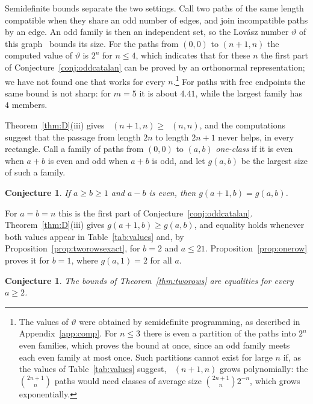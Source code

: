 \documentclass[11pt]{amsart}
\newtheorem{conjecture}[theorem]{Conjecture}
\theoremstyle{definition}
\theoremstyle{remark}
\numberwithin{equation}{section}
\DeclareMathOperator{\Meven}{M_{ev}}
\DeclareMathOperator{\Modd}{M_{od}}
\begin{document}
Semidefinite bounds separate the two settings. Call two paths of the same length compatible when they share an odd number of edges, and join incompatible paths by an edge. An odd family is then an independent set, so the Lov\'asz number $\vartheta$ of this graph~\cite{Lo} bounds its size. For the paths from $(0,0)$ to $(n+1,n)$ the computed value of $\vartheta$ is $2^n$ for $n\le4$, which indicates that for these $n$ the first part of Conjecture~\ref{conj:oddcatalan} can be proved by an orthonormal representation; we have not found one that works for every $n$.\footnote{The values of $\vartheta$ were obtained by semidefinite programming, as described in Appendix~\ref{app:comp}. For $n\le3$ there is even a partition of the paths into $2^n$ even families, which proves the bound at once, since an odd family meets each even family at most once. Such partitions cannot exist for large $n$ if, as the values of Table~\ref{tab:values} suggest, $\Meven(n+1,n)$ grows polynomially: the $\binom{2n+1}{n}$ paths would need classes of average size $\binom{2n+1}{n}2^{-n}$, which grows exponentially.} For paths with free endpoints the same bound is not sharp: for $m=5$ it is about $4.41$, while the largest family has $4$ members.

Theorem~\ref{thm:D}(iii) gives $\Modd(n+1,n)\ge\Meven(n,n)$, and the computations suggest that the passage from length $2n$ to length $2n+1$ never helps, in every rectangle. Call a family of paths from $(0,0)$ to $(a,b)$ \emph{one-class} if it is even when $a+b$ is even and odd when $a+b$ is odd, and let $g(a,b)$ be the largest size of such a family.

\begin{conjecture}\label{conj:shift}
If $a\ge b\ge1$ and $a-b$ is even, then $g(a+1,b)=g(a,b)$.
\end{conjecture}

For $a=b=n$ this is the first part of Conjecture~\ref{conj:oddcatalan}. Theorem~\ref{thm:D}(iii) gives $g(a+1,b)\ge g(a,b)$, and equality holds whenever both values appear in Table~\ref{tab:values} and, by Proposition~\ref{prop:tworowsexact}, for $b=2$ and $a\le21$. Proposition~\ref{prop:onerow} proves it for $b=1$, where $g(a,1)=2$ for all $a$.

\begin{conjecture}\label{conj:tworows}
The bounds of Theorem~\ref{thm:tworows} are equalities for every $a\ge2$.
\end{conjecture}
\end{document}
